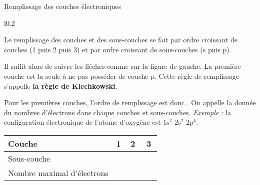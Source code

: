 \begin{doc}{Remplissage des couches électroniques}
  \vspace*{-16pt}
  \begin{wrapfigure}[6]{l}{0.2\linewidth}
    \centering
    \vspace*{-8pt}
  \end{wrapfigure}
  Le remplissage des couches et des sous-couches se fait par ordre croissant de couches (1 puis 2 puis 3) et par ordre croissant de sous-couches (s puis p).
  
  Il suffit alors de suivre les flèches comme sur la figure de gauche.
  La première couche est la seule à ne pas posséder de couche p.
  Cette règle de remplissage s'appelle \textbf{la règle de Klechkowski}.
  
  Pour les premières couches, l'ordre de remplissage est donc  \flecheLongue {} \flecheLongue {} \flecheLongue {} \flecheLongue {}.  On appelle  la donnée du nombres d'électrons dans chaque couches et sous-couches. \textit{Exemple :} la configuration électronique de l'atome d'oxygène  est 1s$^2$ 2s$^2$ 2p$^4$.
\end{doc}


\newpage
\vspace*{-24pt}

\vspace*{-12pt}
\begin{center}
  \begin{tabular}{| l | c | c | c | c | c |}
    \hline \rowcolor{gray!20}
    \centering Couche &
    1 & \multicolumn{2}{c|}{2} &  \multicolumn{2}{c|}{3} \\ \hline
    Sous-couche &
      \hspace{30pt} & \hspace{30pt} & \hspace{90pt} &
      \hspace{30pt} & \hspace{90pt} \\ \hline
    Nombre maximal d'électrons & & & & & \\ \hline
  \end{tabular}
\end{center}


\begin{center}
\end{center}




